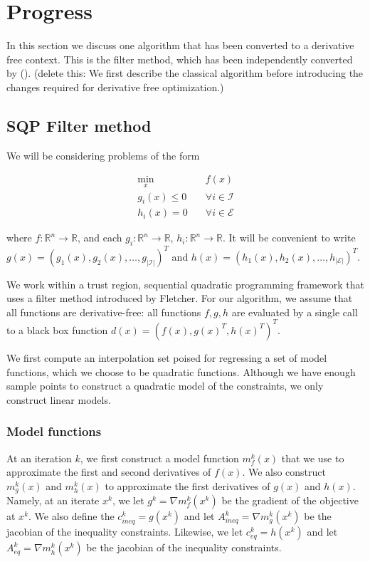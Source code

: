 \documentclass{article}
\begin{document}
\section{Progress}

In this section we discuss one algorithm that has been converted to a derivative free context.
This is the filter method, which has been independently converted by ().
\color{red}
(delete this: We first describe the classical algorithm before introducing the changes required for derivative free optimization.)
\color{black}


\subsection{SQP Filter method}

We will be considering problems of the form


\begin{center}
\begin{align*}
\min_x & \quad f(x) \\
  g_i(x) \le 0   & \quad \forall i \in \mathcal {I} \\
  h_i(x)  = 0    & \quad \forall i \in \mathcal {E} 
\end{align*}
\end{center}
where $f : \mathbb R^n \to \mathbb R$, and each $g_i : \mathbb{R}^{n} \to \mathbb{R}$, $h_i : \mathbb{R}^{n} \to \mathbb{R}$.
It will be convenient to write
$g(x) = (g_1(x), g_2(x), \ldots, g_{|\mathcal{I}|})^T$ and 
$h(x) = (h_1(x), h_2(x), \ldots, h_{|\mathcal{E}|})^T$.

We work within a trust region, sequential quadratic programming framework that uses a filter method introduced by Fletcher.
For our algorithm, we assume that all functions are derivative-free: all functions $f,g,h$ are evaluated by a single call to a black box function $d(x) = (f(x), g(x)^T, h(x)^T)^T$.

We first compute an interpolation set poised for regressing a set of model functions, which we choose to be quadratic functions.
Although we have enough sample points to construct a quadratic model of the constraints, we only construct linear models.

\subsubsection{Model functions}
At an iteration $k$, we first construct a model function $m_f^k(x)$ that we use to approximate the first and second derivatives of $f(x)$.
We also construct $m_g^k(x)$ and $m_h^k(x)$ to approximate the first derivatives of $g(x)$ and $h(x)$.
Namely, at an iterate $x^k$, we let $g^k = \nabla m_f^k(x^k)$ be the gradient of the objective at $x^k$.
We also define the $c_{ineq}^k = g(x^k)$ and let $A_{ineq}^k = \nabla m_g^k(x^k)$ be the jacobian of the inequality constraints.
Likewise, we let $c_{eq}^k = h(x^k)$ and let $A_{eq}^k = \nabla m_h^k(x^k)$ be the jacobian of the inequality constraints.
\end{document}
